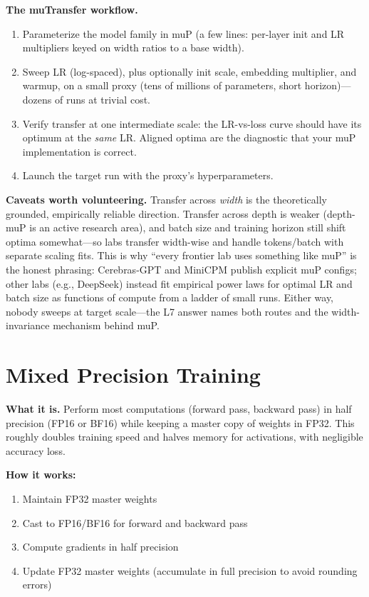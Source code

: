 \textbf{The muTransfer workflow.}
\begin{enumerate}
    \item Parameterize the model family in muP (a few lines: per-layer init and LR multipliers keyed on width ratios to a base width).
    \item Sweep LR (log-spaced), plus optionally init scale, embedding multiplier, and warmup, on a small proxy (tens of millions of parameters, short horizon)---dozens of runs at trivial cost.
    \item Verify transfer at one intermediate scale: the LR-vs-loss curve should have its optimum at the \emph{same} LR. Aligned optima are the diagnostic that your muP implementation is correct.
    \item Launch the target run with the proxy's hyperparameters.
\end{enumerate}

\textbf{Caveats worth volunteering.} Transfer across \emph{width} is the theoretically grounded, empirically reliable direction. Transfer across depth is weaker (depth-muP is an active research area), and batch size and training horizon still shift optima somewhat---so labs transfer width-wise and handle tokens/batch with separate scaling fits. This is why ``every frontier lab uses something like muP'' is the honest phrasing: Cerebras-GPT and MiniCPM publish explicit muP configs; other labs (e.g., DeepSeek) instead fit empirical power laws for optimal LR and batch size as functions of compute from a ladder of small runs. Either way, nobody sweeps at target scale---the L7 answer names both routes and the width-invariance mechanism behind muP.

\section{Mixed Precision Training}
\label{sec:mixed_precision}

\textbf{What it is.} Perform most computations (forward pass, backward pass) in half precision (FP16 or BF16) while keeping a master copy of weights in FP32. This roughly doubles training speed and halves memory for activations, with negligible accuracy loss.

\textbf{How it works:}
\begin{enumerate}
    \item Maintain FP32 master weights
    \item Cast to FP16/BF16 for forward and backward pass
    \item Compute gradients in half precision
    \item Update FP32 master weights (accumulate in full precision to avoid rounding errors)
\end{enumerate}


